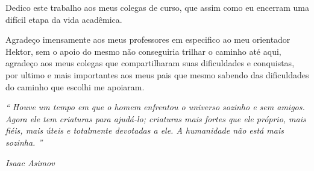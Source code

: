 
\OnehalfSpacing

\imprimircapa

\imprimirfolhaderosto



\begin{dedicatoria}
\null
\vfill
Dedico este trabalho aos meus colegas de curso, que assim como eu encerram uma difícil etapa da vida acadêmica.
\end{dedicatoria}


\begin{agradecimentos}[Agradecimentos]
Agradeço imensamente aos meus professores em especifico ao meu orientador Hektor, sem o apoio do mesmo não conseguiria trilhar o caminho até aqui, agradeço aos meus colegas que compartilharam suas dificuldades e conquistas, por ultimo e mais importantes aos meus pais que mesmo sabendo das dificuldades do caminho que escolhi me apoiaram.
\end{agradecimentos}

\begin{epigrafe}
\null
\vfill \textit{“ Houve um tempo em que o homem enfrentou o universo sozinho e sem amigos. Agora ele tem criaturas para ajudá-lo; criaturas mais fortes que ele próprio, mais fiéis, mais úteis e totalmente devotadas a ele. A humanidade não está mais sozinha. ” }
\begin{flushright}
\textit{Isaac Asimov}
\end{flushright}
\end{epigrafe}






\listoffigures*
\cleardoublepage

\listoftables*
\cleardoublepage

